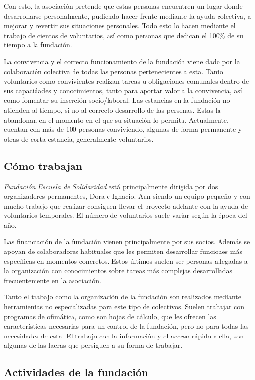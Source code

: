 Con esto, la asociación pretende que estas personas encuentren un lugar donde desarrollarse personalmente, pudiendo hacer frente mediante la ayuda colectiva, a mejorar y revertir sus situaciones personales. Todo esto lo hacen mediante el trabajo de cientos de voluntarios, así como personas que dedican el 100\% de su tiempo a la fundación.

La convivencia y el correcto funcionamiento de la fundación viene dado por la colaboración colectiva de todas las personas pertenecientes a esta. Tanto voluntarios como convivientes realizan tareas u obligaciones comunales dentro de sus capacidades y conocimientos, tanto para aportar valor a la convivencia, así como fomentar su inserción socio/laboral. Las estancias en la fundación no atienden al tiempo, si no al correcto desarrollo de las personas. Estas la abandonan en el momento en el que su situación lo permita. Actualmente, cuentan con más de 100 personas conviviendo, algunas de forma permanente y otras de corta estancia, generalmente voluntarios.

\subsection{Cómo trabajan}

\textit{Fundación Escuela de Solidaridad} está principalmente dirigida por dos organizadores permanentes, Dora e Ignacio. Aun siendo un equipo pequeño y con mucho trabajo que realizar consiguen llevar el proyecto adelante con la ayuda de voluntarios temporales. El número de voluntarios suele variar según la época del año.

Las financiación de la fundación vienen principalmente por sus socios. Además se apoyan de colaboradores habituales que les permiten desarrollar funciones más específicas en momentos concretos. Estos últimos suelen ser personas allegadas a la organización con conocimientos sobre tareas más complejas desarrolladas frecuentemente en la asociación.

Tanto el trabajo como la organización de la fundación son realizados mediante herramientas no especializadas para este tipo de colectivos. Suelen trabajar con programas de ofimática, como son hojas de cálculo, que les ofrecen las características necesarias para un control de la fundación, pero no para todas las necesidades de esta. El trabajo con la información y el acceso rápido a ella, son algunas de las lacras que persiguen a su forma de trabajar.

\subsection{Actividades de la fundación}

